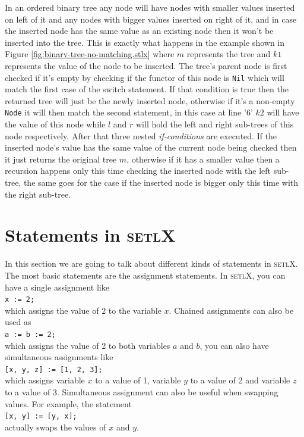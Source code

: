\documentclass[11pt]{report}
\begin{document}
In an ordered binary tree any node will have nodes with smaller values inserted on left of it and any nodes with bigger values inserted on right of it, and in case the inserted node has the same value as an existing node then it won't be inserted into the tree. This is exactly what happens in the example shown in Figure \ref{fig:binary-tree-no-matching.stlx} where $m$ represents the tree and $k1$ represents the value of the node to be inserted. The tree's parent node is first checked if it's empty by checking if the functor of this node is \texttt{Nil} which will match the first case of the switch statement. If that condition is true then the returned tree will just be the newly inserted node, otherwise if it's a non-empty \texttt{Node} it will then match the second statement, in this case at line '$6$' $k2$ will have the value of this node while $l$ and $r$ will hold the left and right sub-trees of this node respectively. After that three nested \textsl{if-conditions} are executed. If the inserted node's value has the same value of the current node being checked then it just returns the original tree $m$, otherwise if it has a smaller value then a recursion happens only this time checking the inserted node with the left sub-tree, the same goes for the case if the inserted node is bigger only this time with the right sub-tree. 

\section{Statements in \textsc{setlX}}
In this section we are going to talk about different kinds of statements in \textsc{setlX}. The most basic statements are the assignment statements. In \textsc{setlX}, you can have a single assignment like
\\[0.2cm]
\hspace*{1.3cm}
\texttt{x := 2;}
\\[0.2cm]
which assigns the value of $2$ to the variable $x$. Chained assignments can also be used as
\\[0.2cm]
\hspace*{1.3cm}
\texttt{a := b := 2;}
\\[0.2cm]
which assigns the value of 2 to both variables $a$ and $b$, you can also have simultaneous assignments like
\\[0.2cm]
\hspace*{1.3cm}
\texttt{[x, y, z] := [1, 2, 3];}
\\[0.2cm]
which assigns variable $x$ to a value of 1, variable $y$ to a value of 2 and variable $z$ to a value of 3. Simultaneous assignment can also be useful when swapping values. For example, the statement
\\[0.2cm]
\hspace*{1.3cm}
\texttt{[x, y] := [y, x];}
\\[0.2cm]
actually swaps the values of $x$ and $y$.
\\
\end{document}
